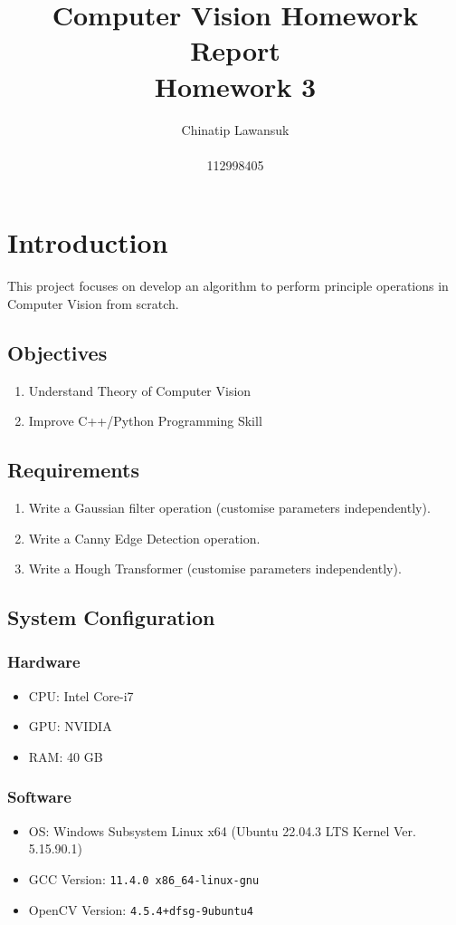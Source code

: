 \documentclass[12pt,a4paper]{report}
\title{Computer Vision Homework Report \\ \Large Homework 3}
\author{Chinatip Lawansuk\\\\112998405}
\date{}
\begin{document}
\maketitle

\tableofcontents

\chapter{Introduction}
This project focuses on develop an algorithm to perform principle operations in Computer Vision from scratch.

\section{Objectives}
\begin{enumerate}
  \item Understand Theory of Computer Vision
  \item Improve C++/Python Programming Skill
\end{enumerate}

\section{Requirements}
\begin{enumerate}
  \item Write a Gaussian filter operation (customise parameters independently).
  \item Write a Canny Edge Detection operation.
  \item Write a Hough Transformer (customise parameters independently).
\end{enumerate}

\section{System Configuration}
\subsection{Hardware}
\begin{itemize}
  \item CPU\@: Intel Core-i7
  \item GPU\@: NVIDIA
  \item RAM\@: 40 GB
\end{itemize}

\subsection{Software}
\begin{itemize}
  \item OS\@: Windows Subsystem Linux x64 (Ubuntu 22.04.3 LTS Kernel Ver. 5.15.90.1)
  \item GCC Version\@: \verb|11.4.0 x86_64-linux-gnu|
  \item OpenCV Version\@: \verb|4.5.4+dfsg-9ubuntu4|
\end{itemize}
\end{document}
